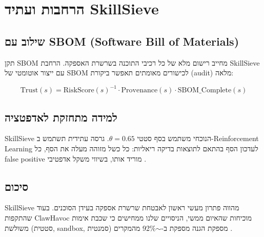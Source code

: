 
\chapter{הרחבות ועתיד \textenglish{SkillSieve}}

\section{שילוב עם \textenglish{SBOM} (\textenglish{Software Bill of Materials})}

תקן \textenglish{SBOM} מחייב רישום מלא של כל רכיבי התוכנה בשרשרת האספקה. הרחבת \textenglish{SkillSieve} עם ייצור אוטומטי של \textenglish{SBOM} לכישורים מאומתים תאפשר ביקורת (\textenglish{audit}) מלאה:

\begin{equation}
\text{Trust}(s) = \text{RiskScore}(s)^{-1} \cdot \text{Provenance}(s) \cdot \text{SBOM\_Complete}(s)
\end{equation}

\section{למידה מתחזקת לאדפטציה}

\textenglish{SkillSieve} הנוכחי משתמש בסף סטטי \(\theta = 0.65\). גרסה עתידית תשתמש ב-\textenglish{Reinforcement Learning} לעדכון הסף בהתאם לתוצאות בדיקה ריאליות: כל כשל מזוהה מעלה את הסף, כל \textenglish{false positive} מוריד אותו, בשיווי משקל אדפטיבי \cite{liu2023prompt}.

\section{סיכום}

\textenglish{SkillSieve} מהווה פתרון מעשי ראשון לאבטחת שרשרת אספקה בעידן הסוכנים. בעוד שהתקפות \textenglish{ClawHavoc} מוכיחות שהאיום ממשי, הניסויים שלנו ממחישים כי שכבת אימות משולשת (סטטית, \textenglish{sandbox}, סמנטית) מספקת הגנה מספקת ב-\textenglish{$\sim$92\%} מהמקרים \cite{nakash2024skillsieve}.
